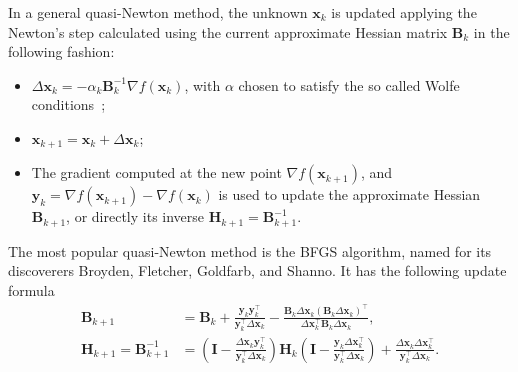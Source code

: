 In a general quasi-Newton method, the unknown \(\mathbf{x}_{k}\) is
updated applying the Newton's step calculated using the current
approximate Hessian matrix \(\mathbf{B}_{k}\) in the following fashion:
\begin{itemize}
\item \(\Delta \mathbf{x}_{k} = -\alpha_{k}\mathbf{B}_{k}^{-1}\nabla
  f(\mathbf{x}_{k})\), with \(\alpha\) chosen to satisfy the so called
  Wolfe conditions~\cite[p.~34]{nocedal&wright};

\item \(\mathbf{x}_{k+1} = \mathbf{x}_{k} + \Delta\mathbf{x}_{k}\);

\item The gradient computed at the new point \(\nabla
  f(\mathbf{x}_{k+1})\), and \(\mathbf{y}_{k} = \nabla
  f(\mathbf{x}_{k+1}) - \nabla f(\mathbf{x}_{k})\) is used to update the
  approximate Hessian \(\mathbf{B}_{k+1}\), or directly its inverse
  \(\mathbf{H}_{k+1} = \mathbf{B}_{k+1}^{-1}\).
\end{itemize}

The most popular quasi-Newton method is the BFGS algorithm, named for
its discoverers Broyden, Fletcher, Goldfarb, and Shanno. It has the
following update formula
\begin{align*}
  \mathbf{B}_{k+1} &= \mathbf{B}_{k} +
                     \frac{\mathbf{y}_{k}\mathbf{y}_{k}^{\top}}{
                     \mathbf{y}_{k}^{\top}\Delta\mathbf{x}_{k}} -
                     \frac{\mathbf{B}_{k}\Delta\mathbf{x}_{k}
                     (\mathbf{B}_{k}\Delta\mathbf{x}_{k})^{\top}}{
                     \Delta\mathbf{x}_{k}^{\top}\mathbf{B}_{k}
                     \Delta\mathbf{x}_{k}},\\
  \mathbf{H}_{k+1} = \mathbf{B}_{k+1}^{-1}
                   &= \left(
                     \mathbf{I} -
                     \frac{\Delta\mathbf{x}_{k}\mathbf{y}_{k}^{\top}}{
                     \mathbf{y}_{k}^{\top}\Delta\mathbf{x}_{k}}
                     \right) \mathbf{H}_{k}
                     \left(
                     \mathbf{I} -
                     \frac{\mathbf{y}_{k}\Delta\mathbf{x}_{k}^{\top}}{
                     \mathbf{y}_{k}^{\top}\Delta\mathbf{x}_{k}}
                     \right) +
                     \frac{\Delta\mathbf{x}_{k}
                     \Delta\mathbf{x}_{k}^{\top}}{
                     \mathbf{y}_{k}^{\top}\Delta\mathbf{x}_{k}}.
\end{align*}

